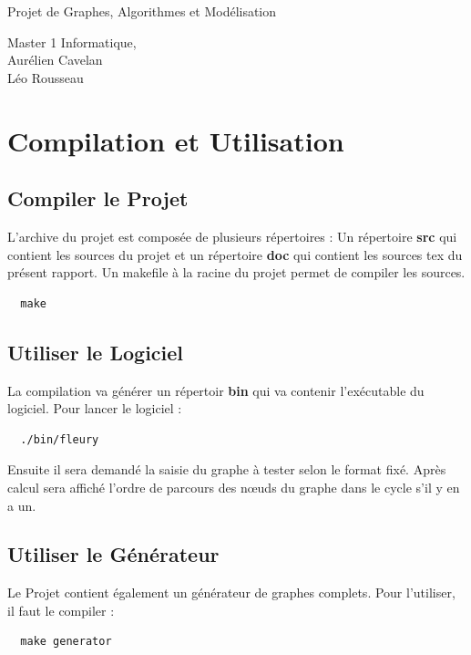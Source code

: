 \documentclass[12pt,a4paper,utf8x]{report}
\begin{document}
\begin{titlepage}

   \hfill
   \begin{center}
   \begin{minipage}[t]{12cm} 
	\huge \center Projet de Graphes, Algorithmes et Modélisation
   \end{minipage}
   \end{center}
\vfill
\begin{flushleft}
\begin{minipage}[t]{5cm}
Master 1 Informatique, \\ Aurélien Cavelan \\ Léo Rousseau
\end{minipage}
\end{flushleft}

\end{titlepage}
\tableofcontents

\chapter{Compilation et Utilisation}
  \section{Compiler le Projet}
  L'archive du projet est composée de plusieurs répertoires : Un répertoire \textbf{src} qui contient les sources du projet et un
  répertoire \textbf{doc} qui contient les sources tex du présent rapport. Un makefile à la racine du projet permet de compiler les sources.

  \begin{lstlisting}
  make
  \end{lstlisting}

  \section{Utiliser le Logiciel}
  La compilation va générer un répertoir \textbf{bin} qui va contenir l'exécutable du logiciel. Pour lancer le logiciel : 
  \begin{lstlisting}
  ./bin/fleury
  \end{lstlisting}

  Ensuite il sera demandé la saisie du graphe à tester selon le format fixé. Après calcul sera affiché l'ordre de parcours des nœuds du graphe dans le cycle s'il y en a un.

  \section{Utiliser le Générateur}
  Le Projet contient également un générateur de graphes complets. Pour l'utiliser, il faut le compiler : 
  \begin{lstlisting}
  make generator
  \end{lstlisting}
\end{document}
